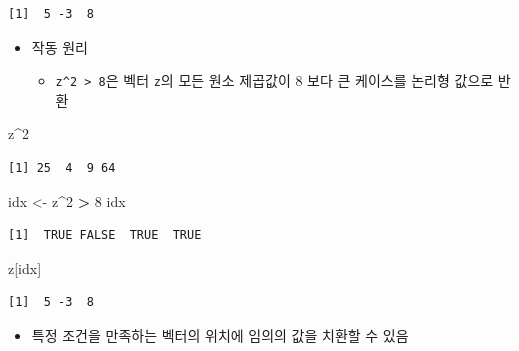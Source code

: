 \documentclass[
  11pt,
]{krantz}
\newenvironment{Shaded}{\begin{snugshade}}{\end{snugshade}}
\newcommand{\DecValTok}[1]{\textcolor[rgb]{0.06,0.06,0.06}{#1}}
\newcommand{\NormalTok}[1]{#1}
\newcommand{\OperatorTok}[1]{\textcolor[rgb]{0.43,0.43,0.43}{\textbf{#1}}}
\newcommand{\StringTok}[1]{\textcolor[rgb]{0.5,0.5,0.5}{#1}}
\providecommand{\tightlist}{%
  \setlength{\itemsep}{0pt}\setlength{\parskip}{0pt}}
\begin{document}
\begin{verbatim}
[1]  5 -3  8
\end{verbatim}

\normalsize

\begin{itemize}
\tightlist
\item
  작동 원리

  \begin{itemize}
  \tightlist
  \item
    \texttt{z\^{}2\ \textgreater{}\ 8}은 벡터 \texttt{z}의 모든 원소 제곱값이 8 보다 큰 케이스를 논리형 값으로 반환
  \end{itemize}
\end{itemize}

\footnotesize

\begin{Shaded}
\begin{Highlighting}[]
\NormalTok{z}\OperatorTok{^}\DecValTok{2}
\end{Highlighting}
\end{Shaded}

\begin{verbatim}
[1] 25  4  9 64
\end{verbatim}

\begin{Shaded}
\begin{Highlighting}[]
\NormalTok{idx <-}\StringTok{ }\NormalTok{z}\OperatorTok{^}\DecValTok{2} \OperatorTok{>}\StringTok{ }\DecValTok{8}
\NormalTok{idx}
\end{Highlighting}
\end{Shaded}

\begin{verbatim}
[1]  TRUE FALSE  TRUE  TRUE
\end{verbatim}

\begin{Shaded}
\begin{Highlighting}[]
\NormalTok{z[idx]}
\end{Highlighting}
\end{Shaded}

\begin{verbatim}
[1]  5 -3  8
\end{verbatim}

\normalsize

\begin{itemize}
\tightlist
\item
  특정 조건을 만족하는 벡터의 위치에 임의의 값을 치환할 수 있음
\end{itemize}
\end{document}
